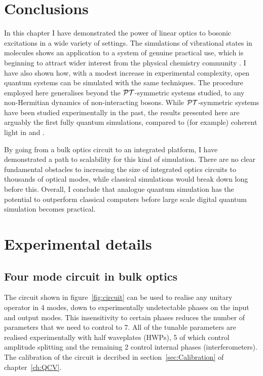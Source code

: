 \section{Conclusions}
In this chapter I have demonstrated the power of linear optics to bosonic
excitations in a wide variety of settings. The simulations of vibrational states
in molecules shows an application to a system of genuine practical use,
which is beginning to attract wider interest from the physical chemistry
community \cite{vibronics}. I have also shown how, with a modest increase in
experimental complexity, open quantum systems can be simulated with the same
techniques. The procedure employed here generalises beyond the \(\mathcal{PT}\)-symmetric
systems studied, to any non-Hermitian dynamics of non-interacting bosons. While
\(\mathcal{PT}\)-symmetric systems have been studied experimentally in the past, the
results presented here are arguably the first fully quantum simulations,
compared to (for example) coherent light in \cite{pt-ruter} and
\cite{pt-regensburger}.

By going from a bulk optics circuit to an integrated platform, I have
demonstrated a path to scalability for this kind of simulation. There are no
clear fundamental obstacles to increasing the size of integrated optics circuits
to thousands of optical modes, while classical simulations would break down long
before this. Overall, I conclude that analogue quantum simulation has the
potential to outperform classical computers before large scale digital quantum
simulation becomes practical.

\section{Experimental details}
\label{sec:SimulationExperiment}
\subsection{Four mode circuit in bulk optics}
The circuit shown in figure~\ref{fig:circuit} can be used to realise any
unitary operator in 4 modes, down to experimentally undetectable phases on the
input and output modes. This insensitivity to certain phases reduces the number
of parameters that we need to control to 7. All of the tunable parameters are
realised experimentally with half waveplates (HWPs), 5 of which control
amplitude splitting and the remaining 2 control internal phases
(interferometers). The calibration of the circuit is decribed in
section~\ref{sec:Calibration} of chapter~\ref{ch:QCV}.

